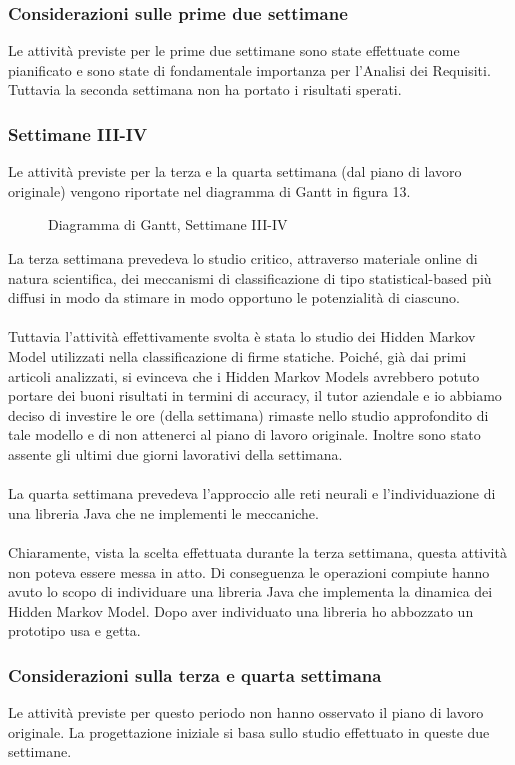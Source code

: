 \subsubsection*{Considerazioni sulle prime due settimane}
\label{3.1.1.1}
Le attività previste per le prime due settimane sono state effettuate come pianificato e sono state di fondamentale importanza per l'Analisi dei Requisiti. Tuttavia la seconda settimana non ha portato i risultati sperati.
\subsubsection{Settimane III-IV}
\label{3.1.2}
Le attività previste per la terza e la quarta settimana (dal piano di lavoro originale) vengono riportate nel diagramma di Gantt in figura 13.
\begin{figure}[H]
\centering
\noindent{}
\caption{Diagramma di Gantt, Settimane III-IV}
\end{figure}
La terza settimana prevedeva lo studio critico, attraverso materiale online di natura scientifica, dei meccanismi di classificazione di tipo statistical-based più diffusi in modo da stimare in modo opportuno le potenzialità di ciascuno.\\\\
Tuttavia l'attività effettivamente svolta è stata lo studio dei Hidden Markov Model utilizzati nella classificazione di firme statiche. Poiché, già dai primi articoli analizzati, si evinceva che i Hidden Markov Models avrebbero potuto portare dei buoni risultati in termini di accuracy, il tutor aziendale e io abbiamo deciso di investire le ore (della settimana) rimaste nello studio approfondito di tale modello e di non attenerci al piano di lavoro originale. Inoltre sono stato assente gli ultimi due giorni lavorativi della settimana.\\\\
La quarta settimana prevedeva l'approccio alle reti neurali e l'individuazione di una libreria Java che ne implementi le meccaniche.\\\\Chiaramente, vista la scelta effettuata durante la terza settimana, questa attività non poteva essere messa in atto. Di conseguenza le operazioni compiute hanno avuto lo scopo di individuare una libreria Java che implementa la dinamica dei Hidden Markov Model. Dopo aver individuato una libreria ho abbozzato un prototipo usa e getta.
\subsubsection*{Considerazioni sulla terza e quarta settimana}
Le attività previste per questo periodo non hanno osservato il piano di lavoro originale. La progettazione iniziale si basa sullo studio effettuato in queste due settimane.
\label{3.1.2.1}
